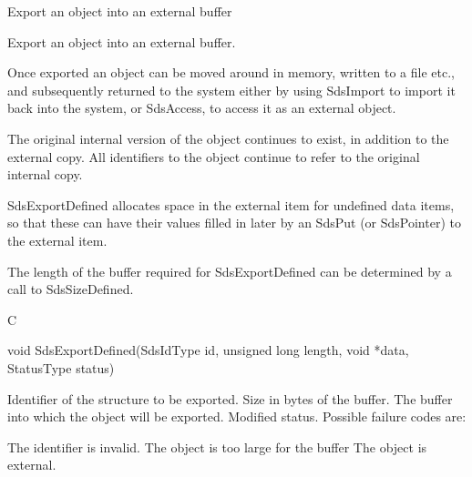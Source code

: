 \begin{manroutinedescription}
      Export an object into an external buffer

      Export an object into an external buffer.

      Once exported an object can be moved around in memory, written to
      a file etc., and subsequently returned to the {} system %
either by using
      SdsImport to import it back into the system, or SdsAccess, to access it
      as an external object.

      The original internal version of the
      object continues to exist, in addition to the external copy. All
      identifiers to the object continue to refer to the original internal
      copy.
 
      SdsExportDefined allocates space in the external item for undefined
      data items, so that these can have their values filled in later
      by an SdsPut (or SdsPointer) to the external item.

      The length of the buffer required for SdsExportDefined can be determined
      by a call to SdsSizeDefined.
 
      C

      void SdsExportDefined(SdsIdType id, unsigned long length,
                    void *data, StatusType {\mantt{*}} {} %
status)
 
\begin{manparametertable}
  Identifier of the structure to %
be exported.
 Size in bytes of the %
buffer.
 The buffer into which the object %
will be
                          exported.
 Modified status. Possible %
failure codes are:
\end{manparametertable}
\begin{mantwocolumntable}
The identifier is invalid.
The object is too large for %
the buffer
The object is external.
\end{mantwocolumntable}
\end{manroutinedescription}

